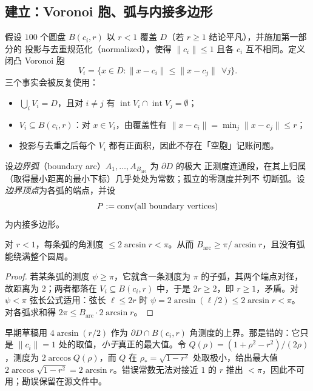 \subsection{建立：Voronoi 胞、弧与内接多边形}

假设 $100$ 个圆盘 $B(c_i,r)$ 以 $r<1$ 覆盖 $D$（若 $r\ge1$ 结论平凡），并施加第一部分的
投影与去重规范化（normalized），使得 $\|c_i\|\le1$ 且各 $c_i$ 互不相同。定义闭凸
Voronoi 胞
\[
V_i=\{x\in D:\|x-c_i\|\le\|x-c_j\|\ \ \forall j\}.
\]
三个事实会被反复使用：
\begin{itemize}[leftmargin=1.4em,itemsep=2pt]
\item $\bigcup_iV_i=D$，且对 $i\ne j$ 有
$\operatorname{int}V_i\cap\operatorname{int}V_j=\emptyset$；
\item $V_i\subseteq B(c_i,r)$：对 $x\in V_i$，由覆盖性有
$\|x-c_i\|=\min_j\|x-c_j\|\le r$；
\item 投影与去重之后每个 $V_i$ 都有正面积，因此不存在「空胞」记账问题。
\end{itemize}
设\emph{边界弧}（boundary arc）$A_1,\dots,A_{B_{\mathrm{arc}}}$ 为 $\partial D$ 的极大
正测度连通段，在其上归属（取得最小距离的最小下标）几乎处处为常数；孤立的零测度并列不
切断弧。设\emph{边界顶点}为各弧的端点，并设
\[
P:=\operatorname{conv}(\text{all boundary vertices})
\]
为内接多边形。

\begin{lemma}\label{lem:arc}
对 $r<1$，每条弧的角测度 $\le2\arcsin r<\pi$。从而
$B_{\mathrm{arc}}\ge\pi/\arcsin r$，且没有弧能绕满整个圆周。
\end{lemma}
\begin{proof}
若某条弧的测度 $\psi\ge\pi$，它就含一条测度为 $\pi$ 的子弧，其两个端点对径，故距离为
$2$；两者都落在 $V_i\subseteq B(c_i,r)$ 中，于是 $2r\ge2$，即 $r\ge1$，矛盾。对
$\psi<\pi$ 弦长公式适用：弦长 $\ell\le2r$ 时 $\psi=2\arcsin(\ell/2)\le2\arcsin r<\pi$。
对各弧求和得 $2\pi\le B_{\mathrm{arc}}\cdot2\arcsin r$。
\end{proof}

\begin{remark}[一个被更正并留档的常数]
早期草稿用 $4\arcsin(r/2)$ 作为 $\partial D\cap B(c_i,r)$ 角测度的上界。那是错的：它只是
$\|c_i\|=1$ 处的取值，\emph{小于}真正的最大值。令
$Q(\rho)=(1+\rho^2-r^2)/(2\rho)$，测度为 $2\arccos Q(\rho)$，而 $Q$ 在
$\rho_\ast=\sqrt{1-r^2}$ 处取极小，给出最大值
$2\arccos\sqrt{1-r^2}=2\arcsin r$。错误常数无法对接近 $1$ 的 $r$ 推出 $<\pi$，因此不可
用；勘误保留在源文件中。
\end{remark}

